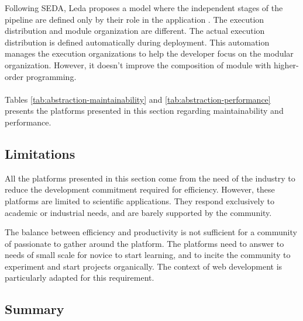 Following SEDA, Leda proposes a model where the independent stages of the pipeline are defined only by their role in the application \cite{Salmito2013,Salmito2014}.
The execution distribution and module organization are different.
The actual execution distribution is defined automatically during deployment. %
This automation manages the execution organizations to help the developer focus on the modular organization.
However, it doesn't improve the composition of module with higher-order programming.

\paragraph{}

Tables \ref{tab:abstraction-maintainability} and \ref{tab:abstraction-performance} presents the platforms presented in this section regarding maintainability and performance.





\subsection{Limitations}

All the platforms presented in this section come from the need of the industry to reduce the development commitment required for efficiency.
However, these platforms are limited to scientific applications.
They respond exclusively to academic or industrial needs, and are barely supported by the community.

The balance between efficiency and productivity is not sufficient for a community of passionate to gather around the platform.
The platforms need to answer to needs of small scale for novice to start learning, and to incite the community to experiment and start projects organically.
The context of web development is particularly adapted for this requirement.


\subsection{Summary}

